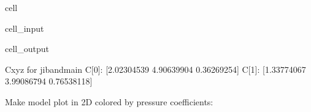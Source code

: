 \documentclass[a4paper,12pt,english]{jupyterBook}
\begin{document}
\begin{sphinxuseclass}{cell}\begin{sphinxVerbatimInput}

\begin{sphinxuseclass}{cell_input}
\begin{sphinxVerbatim}[commandchars=\\\{\}]
   
    
    \PYG{l+s+s2}{C[}\PYG{l+s+s2}{]: }
\end{sphinxVerbatim}

\end{sphinxuseclass}\end{sphinxVerbatimInput}
\begin{sphinxVerbatimOutput}

\begin{sphinxuseclass}{cell_output}
\begin{sphinxVerbatim}[commandchars=\\\{\}]
Cxyz for jib\PYGZus{}and\PYGZus{}main
C[0]: [\PYGZhy{}2.02304539  4.90639904 \PYGZhy{}0.36269254]
C[1]: [\PYGZhy{}1.33774067  3.99086794 \PYGZhy{}0.76538118]
\end{sphinxVerbatim}

\end{sphinxuseclass}\end{sphinxVerbatimOutput}

\end{sphinxuseclass}
\sphinxAtStartPar
Make model plot in 2D colored by pressure coefficients:
\end{document}
